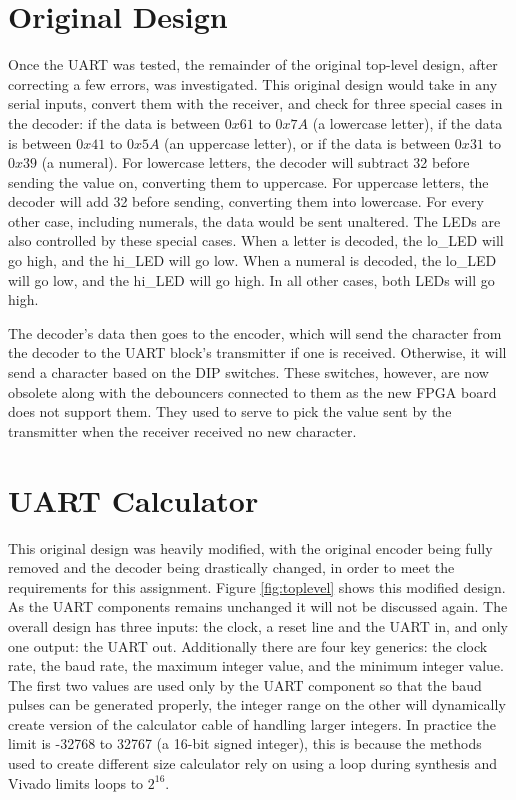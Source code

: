 \documentclass[11pt]{article}
\begin{document}
\section{Original Design}
Once the UART was tested, the remainder of the original top-level design, after correcting a few errors, was investigated.
This original design would take in any serial inputs, convert them with the receiver, and check for three special cases in the decoder:
if the data is between $0x61$ to $0x7A$ (a lowercase letter), 
if the data is between $0x41$ to $0x5A$ (an uppercase letter), 
or if the data is between $0x31$ to $0x39$ (a numeral).
For lowercase letters, the decoder will subtract 32 before sending the value on, converting them to uppercase.
For uppercase letters, the decoder will add 32 before sending, converting them into lowercase.
For every other case, including numerals, the data would be sent unaltered.
The LEDs are also controlled by these special cases.
When a letter is decoded, the lo\_LED will go high, and the hi\_LED will go low.
When a numeral is decoded,  the lo\_LED will go low, and the hi\_LED will go high.
In all other cases, both LEDs will go high.

The decoder's data then goes to the encoder, which will send the character from the decoder to the UART block's transmitter if one is received.
Otherwise, it will send a character based on the DIP switches.
These switches, however, are now obsolete along with the debouncers connected to them as the new FPGA board does not support them.
They used to serve to pick the value sent by the transmitter when the receiver received no new character.


\section{UART Calculator}
This original design was heavily modified, with the original encoder being fully removed and the decoder being drastically changed, in order to meet the requirements for this assignment.
Figure \ref{fig:toplevel} shows this modified design.
As the UART components remains unchanged it will not be discussed again.
The overall design has three inputs: the clock, a reset line and the UART in, and only one output: the UART out.
Additionally there are four key generics: the clock rate, the baud rate, the maximum integer value, and the minimum integer value.
The first two values are used only by the UART component so that the baud pulses can be generated properly,
the integer range on the other will dynamically create version of the calculator cable of handling larger integers.
In practice the limit is -32768 to 32767 (a 16-bit signed integer), this is because the methods used to create different size calculator rely on using a loop during synthesis and Vivado limits loops to $2^{16}$.
\end{document}
